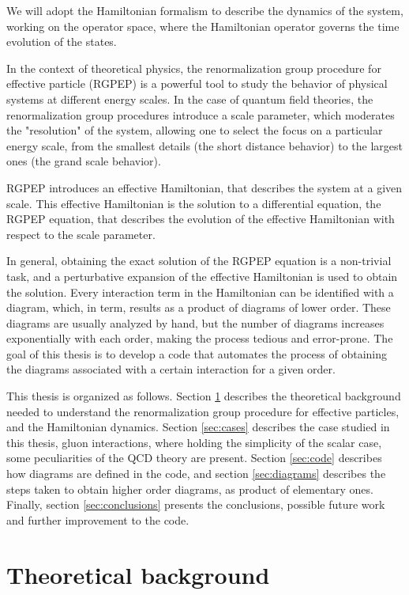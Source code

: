 \documentclass[11pt,a4paper,twoside,pdf]{article}
\numberwithin{equation}{section}
\begin{document}
We will adopt the Hamiltonian formalism to describe the dynamics of the system, 
working on the operator space, where the Hamiltonian operator governs the time
evolution of the states. 

In the context of theoretical physics, the renormalization group procedure 
for effective particle (RGPEP) is a powerful tool to study the behavior of physical systems 
at different energy scales. In the case of quantum field theories, the renormalization 
group procedures introduce a scale parameter, which moderates the "resolution" of the 
system, allowing one to select the focus on a particular energy scale, from 
the smallest details (the short distance behavior) to the largest ones (the grand 
scale behavior). 

RGPEP introduces an effective Hamiltonian, that describes the system at a
given scale. This effective Hamiltonian is the solution to a differential equation,
the RGPEP equation, that describes the evolution of the effective Hamiltonian with 
respect to the scale parameter.

In general, obtaining the exact solution of the RGPEP equation is a non-trivial task, 
and a perturbative expansion of the effective Hamiltonian is used to obtain the 
solution. Every interaction term in the Hamiltonian can be identified with a 
diagram, which, in term, results as a product of diagrams of lower order.
These diagrams are usually analyzed by hand, but the 
number of diagrams increases exponentially with each order, making the process 
tedious and error-prone. The goal of this thesis is to develop a code that automates 
the process of obtaining the diagrams associated with a certain interaction for a 
given order.

This thesis is organized as follows. Section \ref{sec:theoretical_background} describes
the theoretical background needed to understand the renormalization group procedure
for effective particles, and the Hamiltonian dynamics. Section \ref{sec:cases}
describes the case studied in this thesis, gluon interactions, where
holding the simplicity of the scalar case, some peculiarities of the QCD theory are 
present. Section \ref{sec:code} describes how diagrams are defined in the code, 
and section \ref{sec:diagrams} describes the steps taken to obtain higher 
order diagrams, as product of elementary ones. Finally, 
section \ref{sec:conclusions} presents the conclusions, possible future work and 
further improvement to the code.

\section{Theoretical background} \label{sec:theoretical_background}
\end{document}
